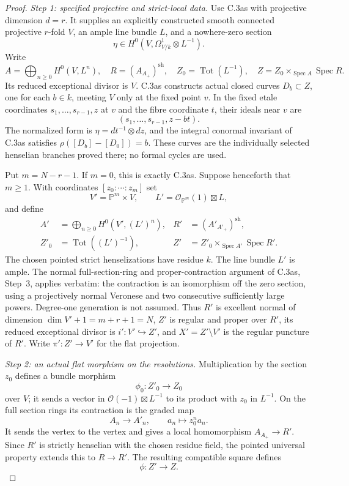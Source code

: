 \begin{proof}
\emph{Step 1: specified projective and strict-local data.}
Use C.3as with projective dimension $d=r$. It supplies an explicitly
constructed smooth connected projective $r$-fold $V$, an ample line
bundle $L$, and a nowhere-zero section
\[
 \eta\in H^0(V,\Omega^1_{V/k}\otimes L^{-1}).
\]
Write
\[
 A=\bigoplus_{n\ge0}H^0(V,L^n),\quad
 R=(A_{A_+})^{\mathrm{sh}},\quad
 Z_0=\operatorname{Tot}(L^{-1}),\quad
 Z=Z_0\times_{\operatorname{Spec}A}\operatorname{Spec}R.
\]
Its reduced exceptional divisor is $V$. C.3as constructs actual
closed curves $D_b\subset Z$, one for each $b\in k$, meeting $V$
only at the fixed point $v$. In the fixed etale coordinates
$s_1,\ldots,s_{r-1},z$ at $v$ and the fibre coordinate $t$, their
ideals near $v$ are
\[
                  (s_1,\ldots,s_{r-1},z-bt).
\]
The normalized form is $\eta=dt^{-1}\otimes dz$, and the integral
conormal invariant of C.3as satisfies
$\rho([D_b]-[D_0])=b$. These curves are the individually selected
henselian branches proved there; no formal cycles are used.

Put $m=N-r-1$. If $m=0$, this is exactly C.3as. Suppose henceforth
that $m\ge1$. With coordinates $[z_0:\cdots:z_m]$ set
\[
 V'=\mathbb P^m\times V,\qquad
 L'=\mathcal O_{\mathbb P^m}(1)\boxtimes L,
\]
and define
\[
 \begin{aligned}
 A'&=\bigoplus_{n\ge0}H^0(V',(L')^n),&
 R'&=(A'_{A'_+})^{\mathrm{sh}},\\
 Z'_0&=\operatorname{Tot}((L')^{-1}),&
 Z'&=Z'_0\times_{\operatorname{Spec}A'}\operatorname{Spec}R'.
 \end{aligned}
\]
The chosen pointed strict henselizations have residue $k$.
The line bundle $L'$ is ample. The normal full-section-ring and
proper-contraction argument of C.3as, Step~3, applies verbatim:
the contraction is an isomorphism off the zero section, using a
projectively normal Veronese and two consecutive sufficiently large
powers. Degree-one generation is not assumed. Thus $R'$ is excellent
normal of dimension $\dim V'+1=m+r+1=N$, $Z'$ is regular and proper
over $R'$, its reduced exceptional divisor is $i':V'\hookrightarrow Z'$,
and $X'=Z'\setminus V'$ is the regular puncture of $R'$.
Write $\pi':Z'\to V'$ for the flat projection.

\emph{Step 2: an actual flat morphism on the resolutions.}
Multiplication by the section $z_0$ defines a bundle morphism
\[
 \phi_0:Z'_0\longrightarrow Z_0
\]
over $V$; it sends a vector in
$\mathcal O(-1)\boxtimes L^{-1}$ to its product with $z_0$ in
$L^{-1}$. On the full section rings its contraction is the graded
map
\[
                  A_n\longrightarrow A'_n,\qquad
                               a_n\longmapsto z_0^n a_n.
\]
It sends the vertex to the vertex and gives a local homomorphism
$A_{A_+}\to R'$. Since $R'$ is strictly henselian with the chosen
residue field, the pointed universal property extends this to
$R\to R'$. The resulting compatible square defines
\[
                          \phi:Z'\longrightarrow Z.
\]


\end{proof}
